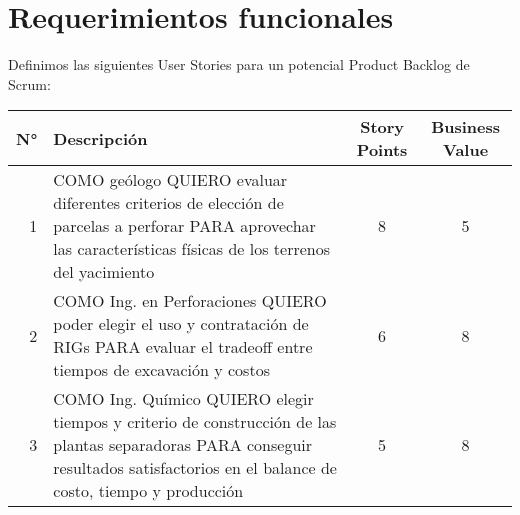 \section{Requerimientos funcionales}

Definimos las siguientes User Stories para un potencial Product Backlog de Scrum:

\begin{center}
  \begin{tabular}{| r | p{10cm} | c | c | }
    \hline
    N° & Descripción & Story Points & Business Value\\  \hline
    1  & COMO geólogo QUIERO evaluar diferentes criterios de elección de parcelas a perforar PARA aprovechar las características físicas de los terrenos del yacimiento & 8 & 5\\  \hline
    2  & COMO Ing. en Perforaciones QUIERO poder elegir el uso y contratación de RIGs PARA evaluar el tradeoff entre tiempos de excavación y costos & 6 & 8\\ \hline
    3  & COMO Ing. Químico QUIERO elegir tiempos y criterio de construcción de las plantas separadoras PARA conseguir resultados satisfactorios en el balance de costo, tiempo y producción & 5 & 8\\ \hline
  \end{tabular}
\end{center}

